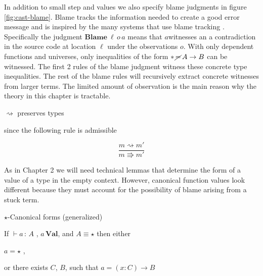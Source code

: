 In addition to small step and values we also specify blame judgments
in figure \ref{fig:cast-blame}. Blame tracks the information needed
to create a good error message and is inspired by the many systems
that use blame tracking \cite{10.1145/581478.581484,10.1007/978-3-642-00590-9_1,wadler:LIPIcs:2015:5033}.
Specifically the judgment $\textbf{Blame}\:\ensuremath{\ell}\,o\,a$
means that $a$witnesses an a contradiction in the source code at
location $\ensuremath{\ell}$ under the observations $o$. With only
dependent functions and universes, only inequalities of the form $*\,\cancel{=}\,A\rightarrow B$
can be witnessed. The first 2 rules of the blame judgment witness
these concrete type inequalities. The rest of the blame rules will
recursively extract concrete witnesses from larger terms. The limited
amount of observation is the main reason why the theory in this chapter
is tractable. %
\begin{fact}
$\rightsquigarrow$ preserves types 

since the following rule is admissible
\end{fact}

\[
\frac{m\rightsquigarrow m'}{m\Rrightarrow m'}
\]

As in Chapter 2 we will need technical lemmas that determine the form
of a value of a type in the empty context. However, canonical function
values look different because they must account for the possibility
of blame arising from a stuck term.
\begin{lem}
$\star$-Canonical forms (generalized)

If $\vdash a\,:\,A$ , $a\,\textbf{Val}$, and $A\equiv\star$ then
either

\textup{$a=\star$ ,}

\textup{or there exists $C$, $B$, such that $a=\left(x:C\right)\rightarrow B$}
\end{lem}

